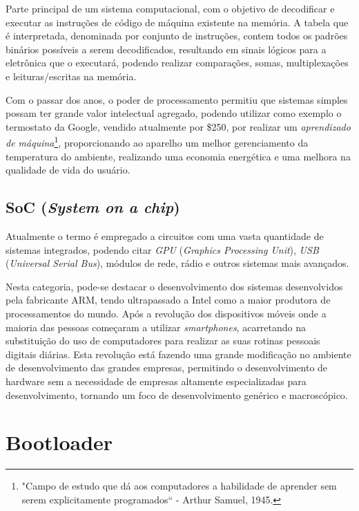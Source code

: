 Parte principal de um sistema computacional, com o objetivo de decodificar e executar as instruções de código de máquina existente na memória\cite{Patterson:2008:COD:1502247}. A tabela que é interpretada, denominada por conjunto de instruções, contem todos os padrões binários possíveis a serem decodificados, resultando em sinais lógicos para a eletrônica que o executará, podendo realizar comparações, somas, multiplexações e leituras/escritas na memória.

Com o passar dos anos, o poder de processamento permitiu que sistemas simples possam ter grande valor intelectual agregado, podendo utilizar como exemplo o termostato da Google, vendido atualmente por \$250, por realizar um \textit{aprendizado de máquina}\footnote{"Campo de estudo que dá aos computadores a habilidade de aprender sem serem explicitamente programados`` -  Arthur Samuel, 1945.}, proporcionando ao aparelho um melhor gerenciamento da temperatura do ambiente, realizando uma economia energética e uma melhora na qualidade de vida do usuário.

\subsection{SoC (\textit{System on a chip})}

Atualmente o termo é empregado a circuitos com uma vasta quantidade de sistemas integrados, podendo citar  \textit{GPU} (\textit{Graphics Processing Unit}), \textit{USB} (\textit{Universal Serial Bus}), módulos de rede, rádio e outros sistemas mais avançados.


Nesta categoria, pode-se destacar o desenvolvimento dos sistemas desenvolvidos pela fabricante ARM, tendo ultrapassado a Intel como a maior produtora de processamentos do mundo.
Após a revolução dos dispositivos móveis onde a maioria das pessoas começaram a utilizar \textit{smartphones}, acarretando na substituição do uso de computadores para realizar as suas rotinas pessoais digitais diárias. Esta revolução está fazendo uma grande modificação no ambiente de desenvolvimento das grandes empresas, permitindo o desenvolvimento de hardware sem a necessidade de empresas altamente especializadas para desenvolvimento, tornando um foco de desenvolvimento genérico e macroscópico.


\section{Bootloader}

